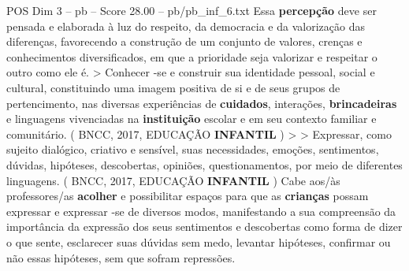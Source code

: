 \begin{textsample}{POS Dim 3 – pb – Score 28.00 – pb/pb\_inf\_6.txt}
Essa \textbf{percepção} deve ser pensada e elaborada à luz do respeito, da democracia e da valorização das diferenças, favorecendo a construção de um conjunto de valores, crenças e conhecimentos diversificados, em que a prioridade seja valorizar e respeitar o outro como ele é. > Conhecer -se e construir sua identidade pessoal, social e cultural, constituindo uma imagem positiva de si e de seus grupos de pertencimento, nas diversas experiências de \textbf{cuidados}, interações, \textbf{brincadeiras} e linguagens vivenciadas na \textbf{instituição} escolar e em seu contexto familiar e comunitário. ( BNCC, 2017, EDUCAÇÃO \textbf{INFANTIL} ) > > Expressar, como sujeito dialógico, criativo e sensível, suas necessidades, emoções, sentimentos, dúvidas, hipóteses, descobertas, opiniões, questionamentos, por meio de diferentes linguagens. ( BNCC, 2017, EDUCAÇÃO \textbf{INFANTIL} ) Cabe aos/às professores/as \textbf{acolher} e possibilitar espaços para que as \textbf{crianças} possam expressar e expressar -se de diversos modos, manifestando a sua compreensão da importância da expressão dos seus sentimentos e descobertas como forma de dizer o que sente, esclarecer suas dúvidas sem medo, levantar hipóteses, confirmar ou não essas hipóteses, sem que sofram repressões.

\end{textsample}
